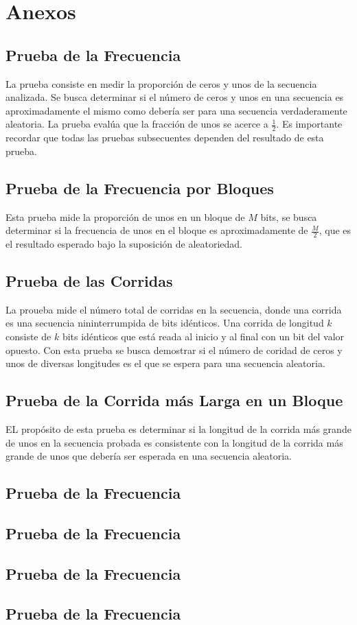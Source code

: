 \chapter*{Anexos}


\section*{Prueba de la Frecuencia}
La prueba consiste en medir la proporción de ceros y unos de la secuencia analizada. Se busca determinar si el número de ceros y unos en una secuencia es aproximadamente el mismo como debería ser para una secuencia verdaderamente aleatoria. La prueba evalúa que la fracción de unos  se acerce a $\frac{1}{2}$. Es importante recordar que todas las pruebas subsecuentes dependen del resultado de esta prueba.


\section*{Prueba de la Frecuencia por Bloques}
Esta prueba mide la proporción de unos en un bloque de $M$ bits, se busca determinar si la frecuencia de unos en el bloque es aproximadamente de $\frac{M}{2}$, que es el resultado esperado bajo la suposición de aleatoriedad. 

\section*{Prueba de las Corridas}
La proueba mide el número total de corridas en la secuencia, donde una corrida es una secuencia nininterrumpida de bits idénticos. Una corrida de longitud $k$ consiste de $k$ bits idénticos que está reada al inicio y al final con un bit del valor opuesto. Con esta prueba se busca demostrar si el número de coridad de ceros y unos de diversas longitudes es el que se espera para una secuencia aleatoria.

\section*{Prueba de la Corrida más Larga en un Bloque}

EL propósito de esta prueba es determinar si la longitud de la corrida más grande de unos en la secuencia probada es consistente con la longitud de la corrida más grande de unos que debería ser esperada en una secuencia aleatoria.




\section*{Prueba de la Frecuencia}
\section*{Prueba de la Frecuencia}
\section*{Prueba de la Frecuencia}
\section*{Prueba de la Frecuencia}
